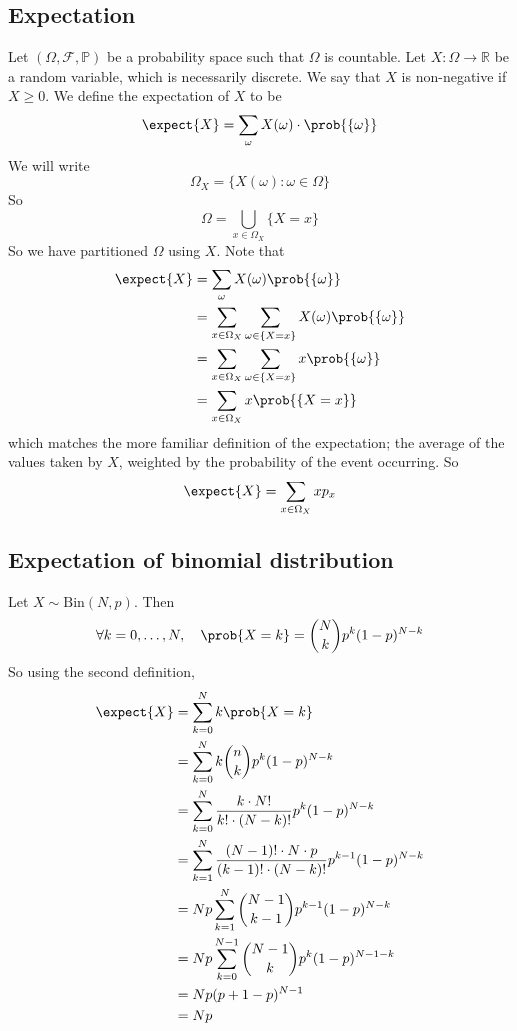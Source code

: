 \subsection{Expectation}
Let \((\Omega, \mathcal F, \mathbb P)\) be a probability space such that \(\Omega\) is countable.
Let \(X \colon \Omega \to \mathbb R\) be a random variable, which is necessarily discrete.
We say that \(X\) is non-negative if \(X \geq 0\).
We define the expectation of \(X\) to be
\[
	\expect{X} = \sum_\omega X(\omega) \cdot \prob{\{ \omega \}}
\]
We will write
\[
	\Omega_X = \{ X(\omega) \colon \omega \in \Omega \}
\]
So
\[
	\Omega = \bigcup_{x \in \Omega_X} \{ X = x \}
\]
So we have partitioned \(\Omega\) using \(X\).
Note that
\begin{align*}
	\expect{X} &= \sum_\omega X(\omega) \prob{\{\omega\}} \\
	&= \sum_{x \in \Omega_X} \sum_{\omega \in \{ X = x\}} X(\omega) \prob{\{\omega\}} \\
	&= \sum_{x \in \Omega_X} \sum_{\omega \in \{ X = x\}} x \prob{\{\omega\}} \\
	&= \sum_{x \in \Omega_X} x\prob{\{X = x \}}
\end{align*}
which matches the more familiar definition of the expectation; the average of the values taken by \(X\), weighted by the probability of the event occurring.
So
\[
	\expect{X} = \sum_{x \in \Omega_X} x p_x
\]

\subsection{Expectation of binomial distribution}
Let \(X \sim \mathrm{Bin}(N, p)\).
Then
\[
	\forall k = 0, \dots, N,\quad \prob{X = k} = \binom{N}{k} p^k (1-p)^{N-k}
\]
So using the second definition,
\begin{align*}
	\expect{X} & = \sum_{k=0}^N k \prob{X = k}                            \\
	           & = \sum_{k=0}^N k \binom{n}{k} p^k (1-p)^{N-k}            \\
	           & = \sum_{k=0}^N \frac{k \cdot N!}{k!
	\cdot (N-k)!} p^k (1-p)^{N-k}                                         \\
	           & = \sum_{k=1}^N \frac{(N-1)!
		\cdot N \cdot p}{(k-1)!
	\cdot (N-k)!} p^{k-1} (1-p)^{N-k}                                     \\
	           & = Np \sum_{k=1}^N \binom{N-1}{k-1} p^{k-1} (1-p)^{N-k}   \\
	           & = Np \sum_{k=0}^{N-1} \binom{N-1}{k} p^{k} (1-p)^{N-1-k} \\
	           & = Np (p + 1 - p)^{N-1}                                   \\
	           & = Np
\end{align*}

